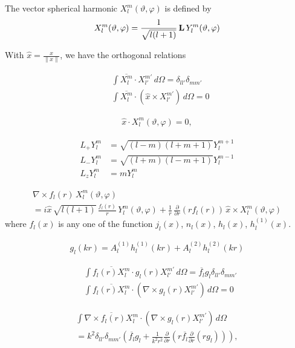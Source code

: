 The vector spherical harmonic $X_l^m(\vartheta,\varphi)$ is defined by 
\begin{align}
  X_l^m(\vartheta, \varphi) = \frac{1}{\sqrt{l(l+1)}}\,{\bf L}\,Y_l^m(\vartheta, \varphi)
\end{align}

With $\hat{x} = \frac{x}{\|x\|}$, we have the orthogonal relations

\begin{align}\label{orth1}
  &\int\overline{X_l^m}\cdot X_{l'}^{m'}\,d\Omega =\delta_{ll'}\delta_{mm'}\\
  &\int\overline{X_l^m}\cdot (\hat{x}\times X_{l'}^{m'})\,d\Omega =0
\end{align}

\begin{align}\label{orth2}
  \hat{x}\cdot X_l^m(\vartheta, \varphi) = 0,
\end{align}

\begin{align}
  L_+Y_l^m &= \sqrt{(l-m)(l+m+1)}Y_l^{m+1}\\
  L_-Y_l^m &= \sqrt{(l+m)(l-m+1)}Y_l^{m-1}\\
  L_zY_l^m &= mY_l^m
\end{align}

\begin{multline}
  \nabla\times f_l(r)\,X_l^m(\vartheta, \varphi)\\=i\hat{x}\,\sqrt{l(l+1)}\,\frac{f_l(r)}{r}\,Y_l^m(\vartheta, \varphi) +\frac{1}{r}\,\frac{\partial}{\partial r}(r f_l(r))\,\hat{x}\times X_l^m(\vartheta, \varphi) 
\end{multline}
where $f_l(x)$ is any one of the function $j_l(x)$, $n_l(x)$, $h_l(x)$, $h_l^{(1)}(x)$.

\begin{align}
  g_l(kr) = A^{(1)}_l h^{(1)}_l(kr) + A^{(2)}_l h^{(2)}_l(kr)
\end{align}

\begin{align}
  &\int\overline{f_l(r)X_l^m}\cdot g_l(r)X_{l'}^{m'}\,d\Omega =\overline{f_l}g_l\delta_{ll'}\delta_{mm'}\\
  &\int\overline{f_l(r)X_l^m}\cdot (\nabla\times g_l(r)X_{l'}^{m'})\,d\Omega =0
\end{align}

\begin{multline}
  \int\overline{\nabla\times f_l(r)X_l^m}\cdot (\nabla\times g_l(r)X_{l'}^{m'})\,d\Omega\\=k^2\delta_{ll'}\delta_{mm'}\left(\overline{f_l}g_l + \frac{1}{k^2 r^2}\frac{\partial}{\partial r}(r\overline{f_l}\frac{\partial}{\partial r}(rg_l))\right), 
\end{multline}
 
